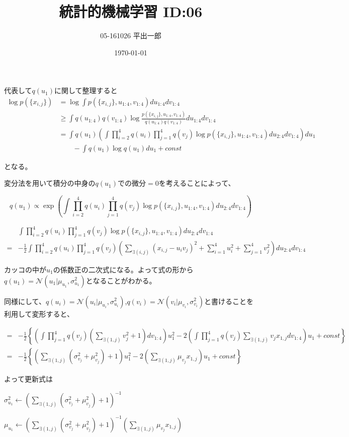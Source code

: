 \documentclass[a4j]{jarticle}
\title{統計的機械学習 ID:06}
\author{05-161026 平出一郎}
\date{\today}
\let \ds \displaystyle
\begin{document}
\thispagestyle{empty}
\maketitle
\pagebreak


代表して$q(u_1)$に関して整理すると
\begin{align*}
\log p(\{x_{i,j}\}) &= \log\int p(\{x_{i,j}\},u_{1:4},v_{1:4})du_{1:4}dv_{1:4} \\
&\geq \int q(u_{1:4})q(v_{1:4})\log \frac{p(\{x_{i,j}\},u_{1:4},v_{1:4})}{q(u_{1:4})q(v_{1:4})}du_{1:4}dv_{1:4} \\
&= \int q(u_1) \left( \int \prod_{i=2}^4q(u_i)\prod_{j=1}^4q(v_j) \log p(\{x_{i,j}\},u_{1:4},v_{1:4}) du_{2:4}dv_{1:4} \right) du_1 \\
&\quad\quad-\int q(u_1) \log q(u_1)du_1 + const
\end{align*}


となる。

変分法を用いて積分の中身の$q(u_1)$での微分$=0$を考えることによって、


$$ q(u_1) \propto \exp\left( \int \prod_{i=2}^4q(u_i)\prod_{j=1}^4q(v_j) \log p(\{x_{i,j}\},u_{1:4},v_{1:4}) du_{2:4}dv_{1:4} \right) $$

\begin{align*}
&\int \prod_{i=2}^4q(u_i)\prod_{j=1}^4q(v_j) \log p(\{x_{i,j}\},u_{1:4},v_{1:4}) du_{2:4}dv_{1:4} \\
=& - \frac{1}{2} \int \prod_{i=2}^4q(u_i)\prod_{j=1}^4q(v_j) \left( \sum_{\exists(i,j)}(x_{i,j}-u_iv_j)^2 + \sum_{i=1}^4 u_i^2 + \sum_{j=1}^4 v_j^2 \right)du_{2:4}dv_{1:4}
\end{align*}

カッコの中が$u_1$の係数正の二次式になる。よって式の形から$q(u_1) = \mathcal{N}(u_1 | \mu_{u_1}, \sigma^2_{u_1})$となることがわかる。

同様にして、$q(u_i) = \mathcal{N}(u_i | \mu_{u_i}, \sigma^2_{u_i})$,$q(v_i) = \mathcal{N}(v_i | \mu_{v_i}, \sigma^2_{v_i})$と書けることを利用して変形すると、


\begin{align*}
=& - \frac{1}{2} \left\{ \left(\int \prod_{j=1}^4q(v_j) \left( \sum_{\exists(1,j)}v_j^2 + 1 \right)dv_{1:4} \right) u_1^2  -2 \left( \int \prod_{j=1}^4q(v_j) \sum_{\exists(1,j)} v_jx_{1,j} dv_{1:4} \right) u_1 + const \right\} \\
=& - \frac{1}{2} \left\{ \left( \sum_{\exists(1,j)} \left(\sigma^2_{v_j}+\mu^2_{v_j} \right) + 1 \right) u_1^2 -2 \left( \sum_{\exists(1,j)} \mu_{v_j}x_{1,j} \right)u_1 + const \right\}
\end{align*}

よって更新式は


$\ds \sigma^2_{u_1} \leftarrow \left( \sum_{\exists(1,j)} \left(\sigma^2_{v_j}+\mu^2_{v_j} \right) + 1 \right)^{-1}$


$\ds \mu_{u_1} \leftarrow \left( \sum_{\exists(1,j)} \left(\sigma^2_{v_j}+\mu^2_{v_j} \right) + 1 \right)^{-1}\left( \sum_{\exists(1,j)} \mu_{v_j}x_{1,j} \right)$
\end{document}
